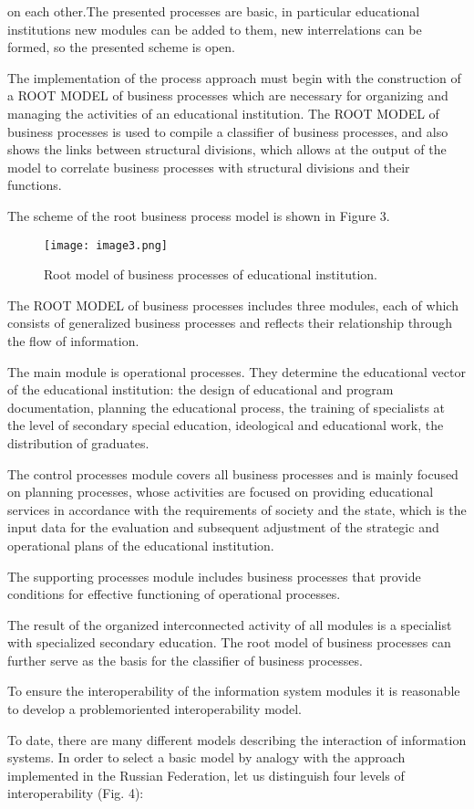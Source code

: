 \documentclass[10pt, a4paper]{article}
\begin{document}
\begin{multicols}{2}
on each other.The presented processes are basic, in
particular educational institutions new modules can be
added to them, new interrelations can be formed, so the
presented scheme is open.
\par
The implementation of the process approach must
begin with the construction of a ROOT MODEL of
business processes which are necessary for organizing
and managing the activities of an educational institution.
The ROOT MODEL of business processes is used to
compile a classifier of business processes, and also shows
the links between structural divisions, which allows at the
output of the model to correlate business processes with
structural divisions and their functions.
\par
The scheme of the root business process model is
shown in Figure 3.
\begin{figure}[H]
  \texttt{[image: image3.png]}
  \caption{Root model of business processes of educational institution.}
\end{figure}
\par
The ROOT MODEL of business processes includes
three modules, each of which consists of generalized
business processes and reflects their relationship through
the flow of information.
\par
The main module is operational processes. They determine the educational vector of the educational institution:
the design of educational and program documentation,
planning the educational process, the training of specialists at the level of secondary special education, ideological and educational work, the distribution of graduates.
\par
The control processes module covers all business
processes and is mainly focused on planning processes,
whose activities are focused on providing educational
services in accordance with the requirements of society
and the state, which is the input data for the evaluation
and subsequent adjustment of the strategic and operational plans of the educational institution.
\par
The supporting processes module includes business
processes that provide conditions for effective functioning of operational processes.
\par
The result of the organized interconnected activity of
all modules is a specialist with specialized secondary
education. The root model of business processes can
further serve as the basis for the classifier of business
processes.
\par
To ensure the interoperability of the information system modules it is reasonable to develop a problemoriented interoperability model.
\par
To date, there are many different models describing the
interaction of information systems. In order to select a
basic model by analogy with the approach implemented
in the Russian Federation, let us distinguish four levels
of interoperability (Fig. 4):
\begin{enumerate}


\end{enumerate}
\end{multicols}
\end{document}
